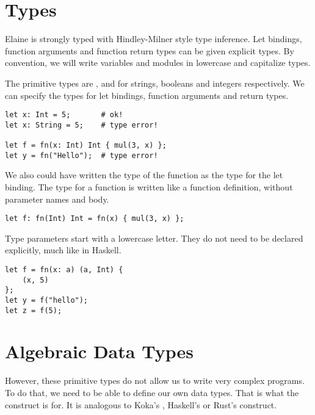 
\section{Types}

Elaine is strongly typed with Hindley-Milner style type inference. Let bindings, function arguments and function return types can be given explicit types. By convention, we will write variables and modules in lowercase and capitalize types.

The primitive types are ,  and  for strings, booleans and integers respectively. We can specify the types for let bindings, function arguments and return types.

\begin{lstlisting}[language=elaine,style=fancy]
let x: Int = 5;       # ok!
let x: String = 5;    # type error!

let f = fn(x: Int) Int { mul(3, x) };
let y = fn("Hello");  # type error!
\end{lstlisting}

We also could have written the type of the function as the type for the let binding. The type for a function is written like a function definition, without parameter names and body.

\begin{lstlisting}[language=elaine,style=fancy]
let f: fn(Int) Int = fn(x) { mul(3, x) };
\end{lstlisting}

Type parameters start with a lowercase letter. They do not need to be declared explicitly, much like in Haskell.

\begin{lstlisting}[language=elaine,style=fancy]
let f = fn(x: a) (a, Int) {
    (x, 5)
};
let y = f("hello");
let z = f(5);
\end{lstlisting}

\section{Algebraic Data Types}

However, these primitive types do not allow us to write very complex programs. To do that, we need to be able to define our own data types. That is what the  construct is for. It is analogous to Koka's , Haskell's  or Rust's  construct.

